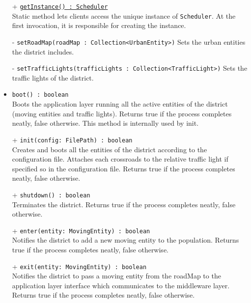 \begin{itemize}
\begin{itemize}
    \item[+] \texttt{\underline{getInstance() : Scheduler}} \\
    Static method lets clients access the unique instance 
    of \texttt{Scheduler}. At the first invocation, it is responsible 
    for creating the instance.
    \item[-] \texttt{setRoadMap(roadMap : Collection<UrbanEntity>)}
    Sets the urban entities the district includes.
    \item[-] \texttt{setTrafficLights(trafficLights : Collection<TrafficLight>)}
    Sets the traffic lights of the district.
    \item \texttt{boot() : boolean} \\
    Boots the application layer running all the active entities of the 
    district (moving entities and traffic lights).
    Returns true if the process completes neatly, false otherwise. 
    This method is internally used by init.
    \item[+] \texttt{init(config: FilePath) : boolean} \\
    Creates and boots all the entities of the district according to the 
    configuration file. Attaches each crossroads to the relative traffic light
    if specified so in the configuration file. 
    Returns true if the process completes neatly, false otherwise.
    \item[+] \texttt{shutdown() : boolean} \\
    Terminates the district. Returns true if the process completes neatly,
    false otherwise.
    \item[+] \texttt{enter(entity: MovingEntity) : boolean} \\
    Notifies the district to add a new moving entity to the population.
    Returns true if the process completes neatly, false otherwise.
    \item[+] \texttt{exit(entity: MovingEntity) : boolean} \\
    Notifies the district to pass a moving entity from the roadMap to the 
    application layer interface which communicates to the middleware layer.
    Returns true if the process completes neatly, false otherwise.
  \end{itemize}
\end{itemize} 
